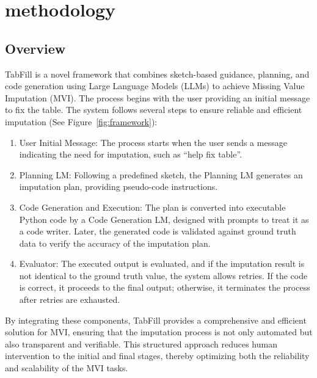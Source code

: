 \documentclass[sigconf]{acmart}
\begin{document}
\section{methodology}

\subsection{Overview}
TabFill is a novel framework that combines sketch-based guidance, planning, and code generation using Large Language Models (LLMs) to achieve Missing Value Imputation (MVI). The process begins with the user providing an initial message to fix the table. The system follows several steps to ensure reliable and efficient imputation (See Figure~\ref{fig:framework}):

\begin{enumerate}
  \item User Initial Message: The process starts when the user sends a message indicating the need for imputation, such as “help fix {table}”.
  \item Planning LM: Following a predefined sketch, the Planning LM generates an imputation plan, providing pseudo-code instructions.
  \item Code Generation and Execution: The plan is converted into executable Python code by a Code Generation LM, designed with prompts to treat it as a code writer. Later, the generated code is validated against ground truth data to verify the accuracy of the imputation plan.
  \item Evaluator: The executed output is evaluated, and if the imputation result is not identical to the ground truth value, the system allows retries. If the code is correct, it proceeds to the final output; otherwise, it terminates the process after retries are exhausted.
\end{enumerate}	

By integrating these components, TabFill provides a comprehensive and efficient solution for MVI, ensuring that the imputation process is not only automated but also transparent and verifiable. This structured approach reduces human intervention to the initial and final stages, thereby optimizing both the reliability and scalability of the MVI tasks.
\end{document}

